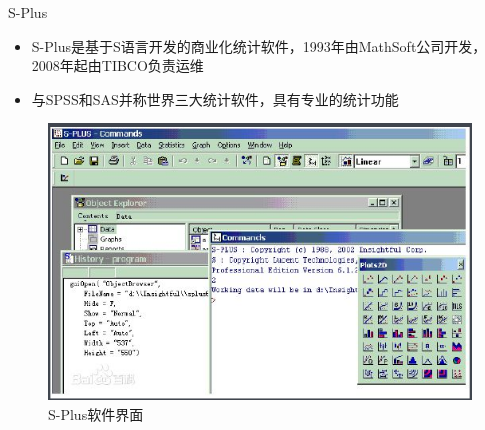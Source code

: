 \documentclass{beamerthemeMono}
\begin{document}
\begin{frame}[t]{\subsecname}{S-Plus}
    \begin{itemize}
      \item S-Plus是基于S语言开发的商业化统计软件，1993年由MathSoft公司开发，
            2008年起由TIBCO负责运维
      \item 与SPSS和SAS并称世界三大统计软件，具有专业的统计功能
    \end{itemize}

    \begin{figure}
      \centering \includegraphics[width=0.8\columnwidth]{splus_ui.png}
      \caption{S-Plus软件界面}
    \end{figure}
\end{frame}    

\begin{frame}{\subsecname}{}


\end{frame} 
\end{document}
